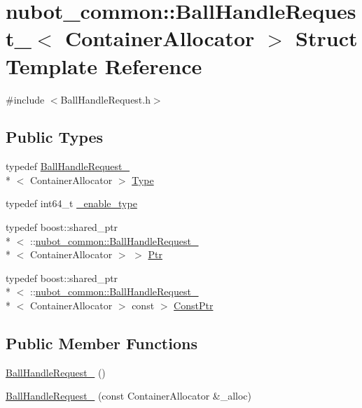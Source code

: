 \hypertarget{structnubot__common_1_1BallHandleRequest__}{\section{nubot\-\_\-common\-:\-:Ball\-Handle\-Request\-\_\-$<$ Container\-Allocator $>$ Struct Template Reference}
\label{structnubot__common_1_1BallHandleRequest__}
}


{\ttfamily \#include $<$Ball\-Handle\-Request.\-h$>$}

\subsection*{Public Types}
\begin{DoxyCompactItemize}
\item 
typedef \hyperlink{structnubot__common_1_1BallHandleRequest__}{Ball\-Handle\-Request\-\_\-}\\*
$<$ Container\-Allocator $>$ \hyperlink{structnubot__common_1_1BallHandleRequest___a83dbef9a3630b37c8b27bfd32ee5a7b6}{Type}
\item 
typedef int64\-\_\-t \hyperlink{structnubot__common_1_1BallHandleRequest___a7fb42c9f6dd627cf51705986d40ed94f}{\-\_\-enable\-\_\-type}
\item 
typedef boost\-::shared\-\_\-ptr\\*
$<$ \-::\hyperlink{structnubot__common_1_1BallHandleRequest__}{nubot\-\_\-common\-::\-Ball\-Handle\-Request\-\_\-}\\*
$<$ Container\-Allocator $>$ $>$ \hyperlink{structnubot__common_1_1BallHandleRequest___a36db0f707fee62292ba7cce6bb70d01f}{Ptr}
\item 
typedef boost\-::shared\-\_\-ptr\\*
$<$ \-::\hyperlink{structnubot__common_1_1BallHandleRequest__}{nubot\-\_\-common\-::\-Ball\-Handle\-Request\-\_\-}\\*
$<$ Container\-Allocator $>$ const  $>$ \hyperlink{structnubot__common_1_1BallHandleRequest___af6a33023ced85fbfd3d7f9ca9c6e9220}{Const\-Ptr}
\end{DoxyCompactItemize}
\subsection*{Public Member Functions}
\begin{DoxyCompactItemize}
\item 
\hyperlink{structnubot__common_1_1BallHandleRequest___a3aa4ee7790e219e7211dadeb0c4e2a23}{Ball\-Handle\-Request\-\_\-} ()
\item 
\hyperlink{structnubot__common_1_1BallHandleRequest___a67939b733192cd14707112f0ae8a2aa1}{Ball\-Handle\-Request\-\_\-} (const Container\-Allocator \&\-\_\-alloc)
\end{DoxyCompactItemize}
